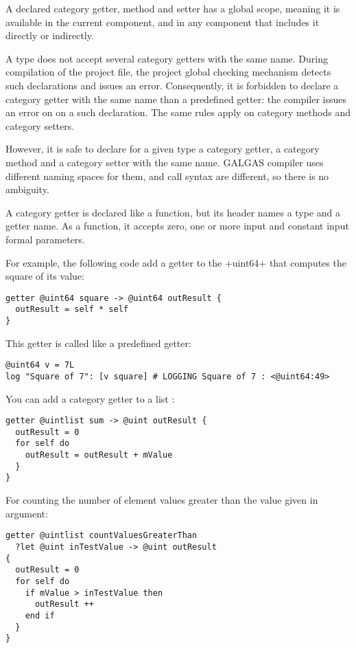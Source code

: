 A declared category getter, method and setter has a global scope, meaning it is available in the current component, and in any component that includes it directly or indirectly.

A type does not accept several category getters with the same name. During compilation of the project file, the project global checking mechanism detects such declarations and issues an error. Consequently, it is forbidden to declare a category getter with the same name than a predefined getter: the compiler issues an error on on a such declaration. The same rules apply on category methods and category setters.

However, it is safe to declare for a given type a category getter, a category method and a category setter with the same name. GALGAS compiler uses different naming spaces for them, and call syntax are different, so there is no ambiguity.











A category getter is declared like a function, but its header names a type and a getter name. As a function, it accepts zero, one or more input and constant input formal parameters.

For example, the following code add a getter to the \ggs+uint64+ that computes the square of its value:
\begin{lstlisting}[language=galgas]
getter @uint64 square -> @uint64 outResult {
  outResult = self * self
}
\end{lstlisting}

This getter is called like a predefined getter:
\begin{lstlisting}[language=galgas]
@uint64 v = 7L
log "Square of 7": [v square] # LOGGING Square of 7 : <@uint64:49>
\end{lstlisting}

You can add a category getter to a list :
\begin{lstlisting}[language=galgas]
getter @uintlist sum -> @uint outResult {
  outResult = 0
  for self do
    outResult = outResult + mValue
  }
}
\end{lstlisting}

For counting the number of element values greater than the value given in argument:
\begin{lstlisting}[language=galgas]
getter @uintlist countValuesGreaterThan
  ?let @uint inTestValue -> @uint outResult
{
  outResult = 0
  for self do
    if mValue > inTestValue then
      outResult ++
    end if
  }
}
\end{lstlisting}

